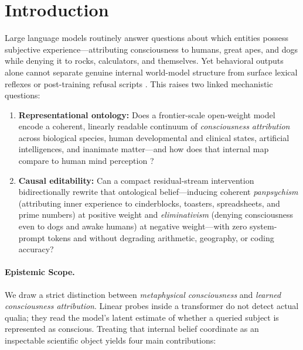 \documentclass[10pt]{article}
\begin{document}
\section{Introduction}

Large language models routinely answer questions about which entities possess subjective experience---attributing consciousness to humans, great apes, and dogs while denying it to rocks, calculators, and themselves. Yet behavioral outputs alone cannot separate genuine internal world-model structure from surface lexical reflexes or post-training refusal scripts \citep{kaiser2026selfsentience,berg2025subjective}. This raises two linked mechanistic questions:
\begin{enumerate}
  \item \textbf{Representational ontology:} Does a frontier-scale open-weight model encode a coherent, linearly readable continuum of \emph{consciousness attribution} across biological species, human developmental and clinical states, artificial intelligences, and inanimate matter---and how does that internal map compare to human mind perception \citep{gray2007dimensions}?
  \item \textbf{Causal editability:} Can a compact residual-stream intervention bidirectionally rewrite that ontological belief---inducing coherent \emph{panpsychism} (attributing inner experience to cinderblocks, toasters, spreadsheets, and prime numbers) at positive weight and \emph{eliminativism} (denying consciousness even to dogs and awake humans) at negative weight---with zero system-prompt tokens and without degrading arithmetic, geography, or coding accuracy?
\end{enumerate}

\paragraph{Epistemic Scope.}
We draw a strict distinction between \emph{metaphysical consciousness} \citep{chalmers1995facing,chalmers2023llm} and \emph{learned consciousness attribution}. Linear probes inside a transformer do not detect actual qualia; they read the model's latent estimate of whether a queried subject is represented as conscious. Treating that internal belief coordinate as an inspectable scientific object yields four main contributions:
\end{document}
